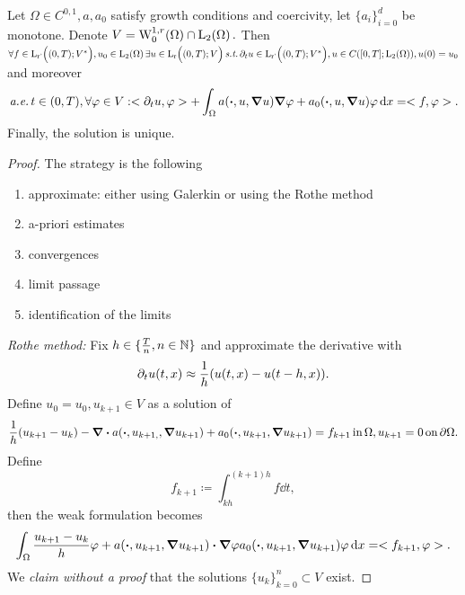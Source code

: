 \documentclass{article}
\begin{document}
\begin{theorem}
	Let $\Omega \in C^{0,1}, a, a_0$ satisfy growth conditions and coercivity, let $\{a_i\}_{i=0}^d$ be monotone. Denote $V = \WkpzeroSet[1][r]{\Omega} \cap \LpSet[2]{\Omega}.$ Then $\forall f \in \LpIntX{r'}{0}{T}{V^{*}}, u_0 \in \LpSet[2]{\Omega} \exists u \in  \LpIntX{r}{0}{T}{V} \, \text{\textit{s.t.}} \, \partial_t u \in \LpIntX{r'}{0}{T}{V^{*}}, u \in C\qty([0,T]; \LpSet[2]{\Omega}), u(0) = u_0$ and moreover
	\[
		\, \text{\textit{a.e.}} \,t \in (0,T), \forall \varphi \in V: <\partial_t u, \varphi> + \int_{\Omega}a\qty(\vdot, u, \grad u) \grad \varphi + a_0\qty(\vdot, u, \grad u)\varphi\dd{x} = <f, \varphi>.
	\]
	Finally, the solution is unique.
\end{theorem}
\begin{proof}
	The strategy is the following 
	\begin{enumerate}
		\item approximate: either using Galerkin or using the Rothe method
		\item a-priori estimates
		\item convergences
		\item limit passage
		\item identification of the limits
	\end{enumerate}

	\textit{Rothe method:} Fix $h \in \{\frac{T}{n}, n \in {\mathbb N}\}$ and approximate the derivative with
	\[
		\partial_t u (t,x) \approx \frac{1}{h}\qty(u\qty(t,x)-u(t-h,x)).
	\]
	Define $u_0 = u_0, u_{k+1} \in V$ as a solution of
	\[
		\frac{1}{h}\qty(u_{k+1}-u_{k}) - \divergence{a\qty(\vdot, u_{k+1,}, \grad u_{k+1})} + a_0\qty(\vdot, u_{k+1}, \grad u_{k+1}) = f_{k+1} \, \text{in} \, \Omega, u_{k+1} = 0 \, \text{on} \, \partial \Omega.
	\]
	Define
	\[
		f_{k+1} \coloneq \int_{kh}^{(k+1)h}f\dd{t},
	\]
	then the weak formulation becomes
	\[
		\int_{\Omega}\frac{u_{k+1}-u_k}{h}\varphi + a\qty(\vdot, u_{k+1}, \grad u_{k+1}) \vdot \grad \varphi a_0\qty(\vdot, u_{k+1}, \grad u_{k+1})\varphi\dd{x} = <f_{k+1}, \varphi>.
	\]
	We \textit{claim without a proof} that the solutions $\{u_k\}_{k=0}^n \subset V$ exist.


\end{proof}
\end{document}

